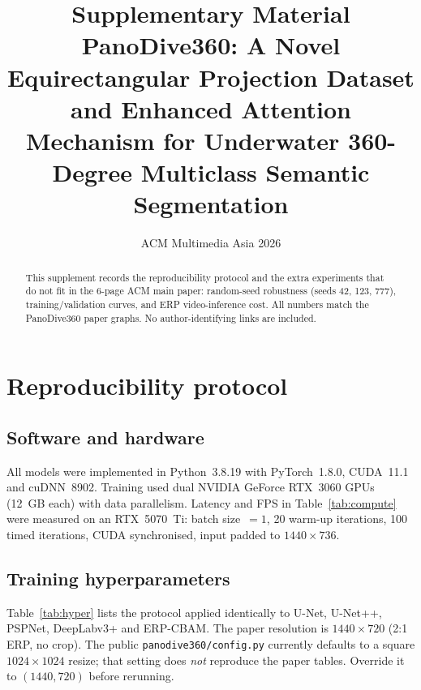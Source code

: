 \documentclass[11pt,a4paper]{article}
\title{\textbf{Supplementary Material}\\[0.4em]
\large PanoDive360: A Novel Equirectangular Projection Dataset and Enhanced Attention Mechanism for Underwater 360-Degree Multiclass Semantic Segmentation}
\author{}
\date{ACM Multimedia Asia 2026}
\begin{document}
\maketitle

\begin{abstract}
\noindent
This supplement records the reproducibility protocol and the extra
experiments that do not fit in the 6-page ACM main paper: random-seed
robustness (seeds 42, 123, 777), training/validation curves, and ERP
video-inference cost. All numbers match the PanoDive360 paper graphs.
No author-identifying links are included.
\end{abstract}

\section{Reproducibility protocol}
\label{sec:protocol}

\subsection{Software and hardware}
All models were implemented in Python~3.8.19 with PyTorch~1.8.0,
CUDA~11.1 and cuDNN~8902.
Training used dual NVIDIA GeForce RTX~3060 GPUs (12~GB each) with
data parallelism.
Latency and FPS in Table~\ref{tab:compute} were measured on an
RTX~5070~Ti: batch size~$=1$, 20 warm-up iterations, 100 timed
iterations, CUDA synchronised, input padded to $1440\times736$.

\subsection{Training hyperparameters}
Table~\ref{tab:hyper} lists the protocol applied identically to
U-Net, U-Net++, PSPNet, DeepLabv3+ and ERP-CBAM.
The paper resolution is $1440\times720$ (2:1 ERP, no crop).
The public \texttt{panodive360/config.py} currently defaults to a
square $1024\times1024$ resize; that setting does \emph{not} reproduce
the paper tables. Override it to $(1440,720)$ before rerunning.
\end{document}
